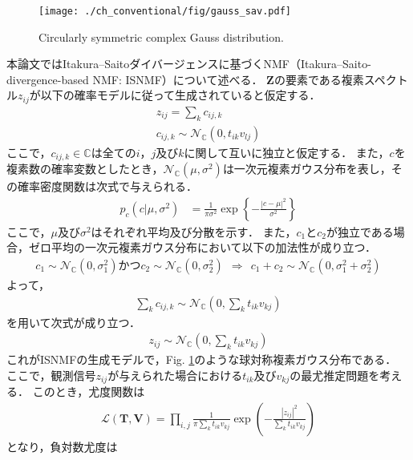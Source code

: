 \begin{figure}[!b]
\centering
\texttt{[image: ./ch\_conventional/fig/gauss\_sav.pdf]}
\caption{Circularly symmetric complex Gauss distribution.}
\label{fig:gauss}
\end{figure}

本論文ではItakura--Saitoダイバージェンスに基づくNMF（Itakura--Saito-divergence-based NMF: ISNMF）\cite{isnmf}について述べる．
$\bm{Z}$の要素である複素スペクトル$z_{ij}$が以下の確率モデルに従って生成されていると仮定する．
\begin{align}
    z_{ij} = \sum_k c_{ij,k} \\
    c_{ij,k} \sim \mathcal{N}_{\mathbb{C}} (0, t_{ik}v_{lj})
\end{align}
ここで，$c_{ij,k} \in \mathbb{C}$は全ての$i$，$j$及び$k$に関して互いに独立と仮定する．
また，$c$を複素数の確率変数としたとき，$\mathcal{N}_{\mathbb{C}} (\mu, \sigma^2)$は一次元複素ガウス分布を表し，その確率密度関数は次式で与えられる．
\begin{align}
    p_c(c | \mu, \sigma^2) &= \frac{1}{\pi \sigma^2} \exp \left\{ -\frac{|c-\mu|^2}{\sigma^2} \right\}
\end{align}
ここで，$\mu$及び$\sigma^2$はそれぞれ平均及び分散を示す．
また，$c_1$と$c_2$が独立である場合，ゼロ平均の一次元複素ガウス分布において以下の加法性が成り立つ．
\begin{align}
    c_1 \sim \mathcal{N}_{\mathbb{C}}(0,\sigma_1^2)かつc_2 \sim \mathcal{N}_{\mathbb{C}}(0,\sigma_2^2) ~~ \Longrightarrow ~~ c_1 + c_2 \sim \mathcal{N}_{\mathbb{C}}(0,\sigma_1^2 + \sigma_2^2)
\end{align}
よって，
\begin{align}
    \sum_k c_{ij,k} \sim \mathcal{N}_{\mathbb{C}}\left( 0, \sum_k t_{ik} v_{kj} \right)
\end{align}
を用いて次式が成り立つ．
\begin{align}
    z_{ij} \sim \mathcal{N}_{\mathbb{C}}\left( 0, \sum_k t_{ik} v_{kj} \right) \label{eq:nmfgen}
\end{align}
これがISNMFの生成モデルで，Fig. \ref{fig:gauss}のような球対称複素ガウス分布である．
ここで，観測信号$z_{ij}$が与えられた場合における$t_{ik}$及び$v_{kj}$の最尤推定問題を考える．
このとき，尤度関数は
\begin{align}
    \mathcal{L}(\bm{T}, \bm{V}) = \prod_{i,j} \frac{1}{\pi \sum_k t_{ik} v_{kj} } \exp \left( -\frac{|z_{ij}|^2}{\sum_k t_{ik} v_{kj}} \right)
\end{align}
となり，負対数尤度は
